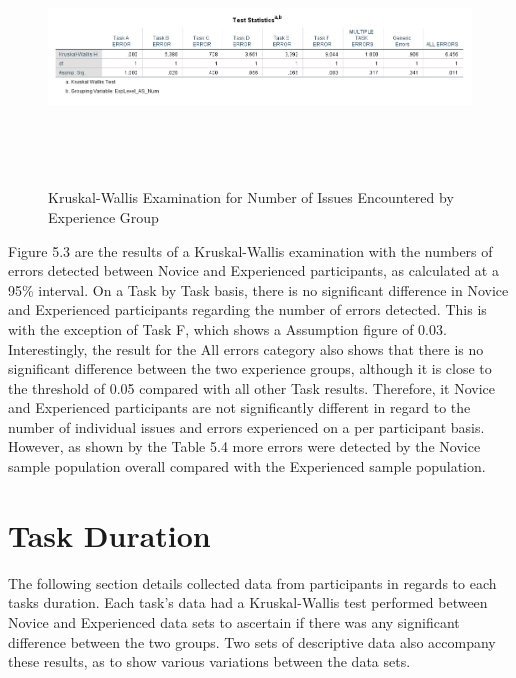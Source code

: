 \begin{figure}[H]
\includegraphics[width=\linewidth,height=6cm]{Screenshots/ErrorRecords/kwErrorsByParticipant.png}
\label{KWErrorsPerGroup}
\caption{Kruskal-Wallis Examination for Number of Issues Encountered by Experience Group}
\end{figure}

Figure 5.3 are the results of a Kruskal-Wallis examination with the numbers of errors detected between Novice and Experienced participants, as calculated at a 95\% interval. On a Task by Task basis, there is no significant difference in Novice and Experienced participants regarding the number of errors detected. This is with the exception of Task F, which shows a Assumption figure of 0.03.  Interestingly, the result for the All errors category also shows that there is no significant difference between the two experience groups, although it is close to the threshold of 0.05 compared with all other Task results. Therefore, it Novice and Experienced participants are not significantly different in regard to the number of individual issues and errors experienced on a per participant basis. However, as shown by the Table 5.4 more errors were detected by the Novice sample population overall compared with the Experienced sample population. 

\section{Task Duration}
The following section details collected data from participants in regards to each tasks duration. Each task's data had a Kruskal-Wallis test performed between Novice and Experienced data sets to ascertain if there was any significant difference between the two groups. Two sets of descriptive data also accompany these results, as to show various variations between the data sets.

